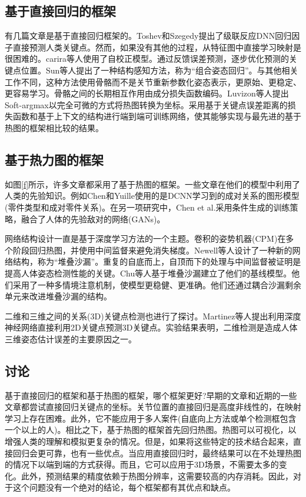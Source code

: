 \documentclass[hyperref]{ctexart}
\begin{document}
\begin{multicols}{2}
		\subsection{基于直接回归的框架}
		有几篇文章是基于直接回归框架的。Toshev和Szegedy\cite{toshev2014deeppose}提出了级联反应DNN回归因子直接预测人类关键点。然而，如果没有其他的过程，从特征图中直接学习映射是很困难的。carira等人\cite{carreira2016human}使用了自校正模型。通过反馈误差预测，逐步优化预测的关键点位置。Sun等人\cite{sun2017compositional}提出了一种结构感知方法，称为“组合姿态回归”。与其他相关工作不同，这种方法使用骨骼而不是关节重新参数化姿态表示，更原始、更稳定、更容易学习。骨骼之间的长期相互作用由成分损失函数编码。Luvizon等人\cite{luvizon2019human}提出Soft-argmax以完全可微的方式将热图转换为坐标。采用基于关键点误差距离的损失函数和基于上下文的结构进行端到端可训练网络，使其能够实现与最先进的基于热图的框架相比较的结果。
		\subsection{基于热力图的框架}
		如图\ref{f}所示，许多文章都采用了基于热图的框架。一些文章在他们的模型中利用了人类的先验知识。例如Chen和Yuille\cite{chen2014articulated}使用的是DCNN学习到的成对关系的图形模型(零件类型和成对零件关系)。在另一项研究中，Chen et al.\cite{chen2017adversarial}采用条件生成的训练策略，融合了人体的先验敌对的网络(GANs)\cite{goodfellow2014generative}。
		
		网络结构设计一直是基于深度学习方法的一个主题。卷积的姿势机器(CPM)\cite{wei2016convolutional}在多个阶段回归热图，并使用中间监督来避免消失梯度。Newell等人\cite{newell2016stacked}设计了一种新的网络结构，称为“堆叠沙漏”。重复的自底而上，自顶而下的处理与中间监督被证明是提高人体姿态检测性能的关键。Chu等人\cite{chu2017multi}基于堆叠沙漏建立了他们的基线模型。他们采用了一种多情境注意机制，使模型更稳健、更准确。他们还通过耦合沙漏剩余单元来改进堆叠沙漏的结构。
		
		二维和三维之间的关系(3D)关键点检测也进行了探讨。Martinez等人\cite{martinez2017simple}提出利用深度神经网络直接利用2D关键点预测3D关键点。实验结果表明，二维检测是造成人体三维姿态估计误差的主要原因之一。
		\subsection{讨论}
		基于直接回归的框架和基于热图的框架，哪个框架更好?早期的文章\cite{toshev2014deeppose}\cite{pfister2014deep}和近期的一些文章\cite{chen2017adversarial}\cite{goodfellow2014generative}都尝试直接回归关键点的坐标。关节位置的直接回归是高度非线性的，在映射学习上存在困难\cite{tompson2014joint}\cite{pfister2015flowing}。此外，它不能应用于多人案件(自底向上方法或单个检测框包含一个以上的人)。相比之下，基于热图的框架首先回归热图。热图可以可视化，以增强人类的理解和模拟更复杂的情况。但是，如果将这些特定的技术结合起来\cite{chen2017adversarial}，直接回归会更可靠，也有一些优点。当应用直接回归时，最终结果可以在不处理热图的情况下以端到端的方式获得。而且，它可以应用于3D场景，不需要太多的变化。此外，预测结果的精度依赖于热图分辨率，这需要较高的内存消耗。因此，对于这个问题没有一个绝对的结论，每个框架都有其优点和缺点。
	\end{multicols}
		
\end{document}
